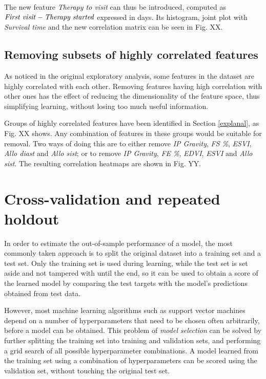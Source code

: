 \documentclass[12pt]{report}
\begin{document}
The new feature \textit{Therapy to visit} can thus be introduced, computed as $ \text{\emph{First visit}} - \text{\emph{Therapy started}} $ expressed in days. Its histogram, joint plot with \textit{Survival time} and the new correlation matrix can be seen in Fig. XX.

\subsection*{Removing subsets of highly correlated features}
As noticed in the original exploratory analysis, some features in the dataset are highly correlated with each other. Removing features having high correlation with other ones has the effect of reducing the dimensionality of the feature space, thus simplifying learning, without losing too much useful information.

Groups of highly correlated features have been identified in Section \ref{explanal}, as Fig. XX shows. Any combination of features in these groups would be suitable for removal. Two ways of doing this are to either remove \textit{IP Gravity}, \textit{FS \%}, \textit{ESVI}, \textit{Allo diast} and \textit{Allo sist}; or to remove \textit{IP Gravity}, \textit{FE \%}, \textit{EDVI}, \textit{ESVI} and \textit{Allo sist}. The resulting correlation heatmaps are shown in Fig. YY.

\section{Cross-validation and repeated holdout}
In order to estimate the out-of-sample performance of a model, the most commonly taken approach is to split the original dataset into a training set and a test set. Only the training set is used during learning, while the test set is set aside and not tampered with until the end, so it can be used to obtain a score of the learned model by comparing the test targets with the model's predictions obtained from test data.

However, most machine learning algorithms such as support vector machines depend on a number of hyperparameters that need to be chosen often arbitrarily, before a model can be obtained. This problem of \textit{model selection} can be solved by further splitting the training set into training and validation sets, and performing a grid search of all possible hyperparameter combinations. A model learned from the training set using a combination of hyperparameters can be scored using the validation set, without touching the original test set.
\end{document}
